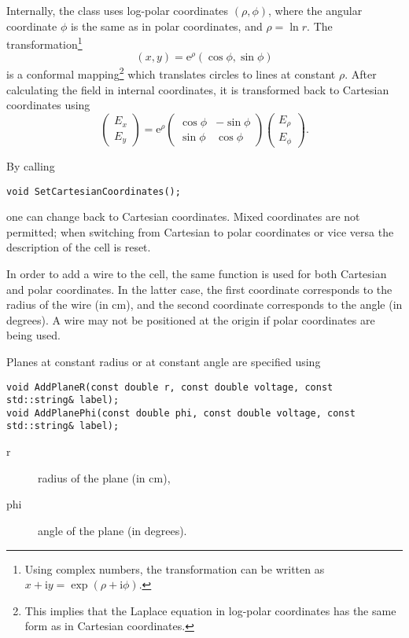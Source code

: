 Internally, the class uses log-polar coordinates $\left(\rho, \phi\right)$, 
where the angular coordinate $\phi$ is the same as in polar coordinates, 
and $\rho = \ln r$. The transformation\footnote{
Using complex numbers, the transformation can be written as 
$x + \text{i}y = \exp\left(\rho + \text{i}\phi\right)$.}
\begin{equation*}
\left(x, y\right) = \text{e}^{\rho}\left(\cos\phi, \sin\phi\right)
\end{equation*}
is a conformal mapping\footnote{This implies that the Laplace equation in log-polar coordinates has the same form as in Cartesian coordinates.} 
which translates circles to lines at constant $\rho$. 
After calculating the field in internal coordinates, it is transformed back to 
Cartesian coordinates using
\begin{equation*}
\begin{pmatrix}E_{x}\\E_{y}\end{pmatrix} = \text{e}^{\rho}
\begin{pmatrix}\cos\phi & -\sin\phi \\ \sin\phi & \cos\phi\end{pmatrix}
\begin{pmatrix}E_{\rho}\\E_{\phi}\end{pmatrix}. 
\end{equation*}

By calling 
\begin{lstlisting}
void SetCartesianCoordinates();
\end{lstlisting} 
one can change back to Cartesian coordinates. 
Mixed coordinates are not permitted; when switching from Cartesian to polar 
coordinates or vice versa the description of the cell is reset.

In order to add a wire 
to the cell, the same function is used 
for both Cartesian and polar coordinates. In the latter case, the 
first coordinate corresponds to the radius of the wire (in cm), 
and the second coordinate corresponds to the angle (in degrees). 
A wire may not be positioned at the origin if polar coordinates are being used.

Planes at constant radius or at constant angle are specified using
\begin{lstlisting}
void AddPlaneR(const double r, const double voltage, const std::string& label);
void AddPlanePhi(const double phi, const double voltage, const std::string& label);
\end{lstlisting}
\begin{description}
  \item[r] radius of the plane (in cm),
  \item[phi] angle of the plane (in degrees).
\end{description}

